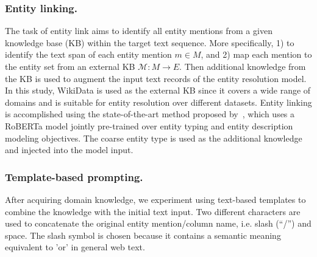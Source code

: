 




\subsubsection{Entity linking.}
The task of entity link aims to identify all entity mentions from a given knowledge base (KB) within the target text sequence. 
More specifically, 1) to identify the text span of each entity mention $m \in M$, and 2) map each mention to the entity set from an external KB $\mathcal{M}: M \rightarrow E$. 
Then additional knowledge from the KB is used to augment the input text records of the entity resolution model.
In this study, WikiData is used as the external KB since it covers a wide range of domains and is suitable for entity resolution over different datasets. 
Entity linking is accomplished using the state-of-the-art method proposed by~\citet{ayoola_refined_2022}, which uses a RoBERTa model jointly pre-trained over entity typing and entity description modeling objectives. The coarse entity type is used as the additional knowledge and injected into the model input.


\subsubsection{Template-based prompting.}
After acquiring domain knowledge, we experiment using text-based templates to combine the knowledge with the initial text input. 
Two different characters are used to concatenate the original entity mention/column name, i.e. slash (``/'') and space. 
The slash symbol is chosen because it contains a semantic meaning equivalent to 'or' in general web text.

